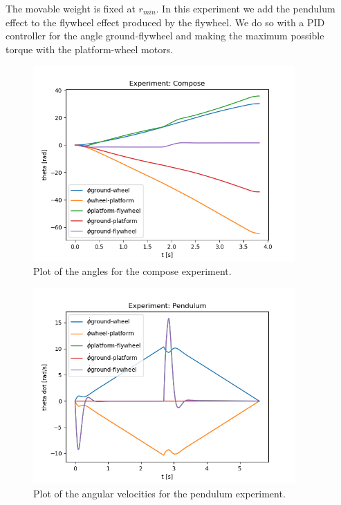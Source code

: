 \begin{enumerate}
	The movable weight is fixed at $r_{min}$. In this experiment we add the pendulum effect to the flywheel effect produced
		  by the flywheel. We do so with a PID controller for the angle ground-flywheel and making the maximum possible torque
		  with the platform-wheel motors. 
	      \begin{figure}[H]
		      \centering
		      \includegraphics[width=10cm]{img/lagrange_5/compose_q.png}
		      \caption{Plot of the angles for the compose experiment.}
		      \label{fig:Simulation compose q}
	      \end{figure}


	      \begin{figure}[H]
		      \centering
		      \includegraphics[width=10cm]{img/lagrange_5/pendulum_q_dot.png}
		      \caption{Plot of the angular velocities for the pendulum experiment.}
		      \label{fig:Simulation compose q dot}
	      \end{figure}
\end{enumerate}